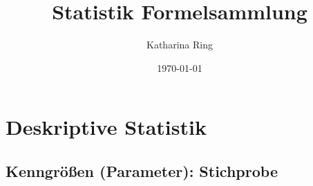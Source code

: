 \documentclass[8pt]{extarticle}
\begin{document}
\title{\Huge Statistik Formelsammlung}
\author{\LARGE Katharina Ring}
\date{\LARGE \today}
\Huge \maketitle \normalsize

\clearpage

\tableofcontents

\clearpage


\raggedright %
\setlength{\parindent}{15pt} %
\setlength{\columnseprule}{0.3pt} %








\section{Deskriptive Statistik}


\subsection{Kenngrößen (Parameter): Stichprobe}
\end{document}
